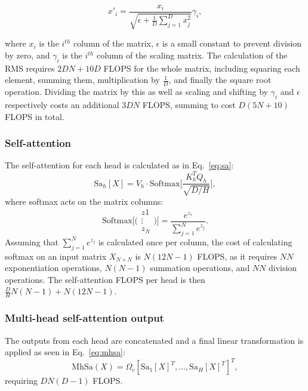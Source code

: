 \documentclass[11pt,a4paper]{article}
\begin{document}
\begin{equation}
    x'_i = \frac{x_i}{\sqrt{\epsilon + \frac{1}{D}\sum^D_{j=1}x_j^2}} \gamma_i,
    \label{eq:rmsnorm}
\end{equation}

where $x_i$ is the $i^{th}$ column of the matrix, $\epsilon$ is a small constant to prevent division by zero, and $\gamma_i$ is the $i^{th}$ column of the scaling matrix. The calculation of the RMS requires $2DN + 10D$ FLOPS for the whole matrix, including squaring each element, summing them, multiplication by $\frac{1}{D}$, and finally the square root operation. Dividing the matrix by this as well as scaling and shifting by $\gamma_i$ and $\epsilon$ respectively costs an additional $3DN$ FLOPS, summing to cost $D(5N +10)$ FLOPS in total.

\subsubsection{Self-attention}
The self-attention for each head is calculated as in Eq.~\ref{eq:sa}:
\begin{equation}
    \mathrm{Sa}_h[X] = V_h \cdot \mathrm{Softmax}\Big[\frac{K_h^TQ_h}{\sqrt{D/H}}\Big],
    \label{eq:sa}
\end{equation}
where softmax acts on the matrix columns:
\begin{equation}
    \mathrm{Softmax}\Bigg[\Bigg(\begin{matrix}
        z1\\
        \vdots\\
        z_N
    \end{matrix}\Bigg)\Bigg] = \frac{e^{z_i}}{\sum^N_{j=1} e^{z_j}}.
    \label{eq:softmax}
\end{equation}
Assuming that $\sum^N_{j=1} e^{z_j}$ is calculated once per column, the cost of calculating softmax on an input matrix $X_{N \times N}$ is $N(12N - 1)$ FLOPS, as it requires $NN$ exponentiation operations, $N(N-1)$ summation operations, and $NN$ division operations. The self-attention FLOPS per head is then $\frac{D}{H}N(N-1) + N(12N - 1)$.

\subsubsection{Multi-head self-attention output}
The outputs from each head are concatenated and a final linear transformation is applied as seen in Eq.~\ref{eq:mhsa}:
\begin{equation}
    \mathrm{MhSa}(X) = \Omega_c[\mathrm{Sa}_1[X]^T, \ldots, \mathrm{Sa}_H[X]^T]^T,
    \label{eq:mhsa}
\end{equation}
requiring $DN(D-1)$ FLOPS.
\end{document}
